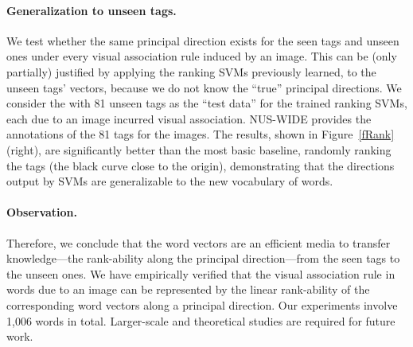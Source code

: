\documentclass[10pt,twocolumn,letterpaper]{article}
\begin{document}
\paragraph{Generalization to unseen tags.} We test whether the same principal direction exists for  the seen tags and unseen ones  under every visual association rule induced by an image. This can be (only partially) justified by applying the ranking SVMs previously learned, to the unseen tags\rq{} vectors, because we do not  know the ``true'' principal directions. We consider the with 81 unseen tags  as the ``test data'' for the trained ranking SVMs, each due to an image incurred visual association. NUS-WIDE provides the annotations of the 81 tags for the images. The results, shown in Figure~\ref{fRank}(right), are significantly better than the most basic baseline, randomly ranking the tags (the black curve close to the origin),  demonstrating that the directions output by SVMs are generalizable to the new vocabulary  of words. \vspace{-15pt}

\paragraph{Observation.} Therefore, we conclude that the word vectors  are an efficient media to transfer knowledge---the  rank-ability along the principal direction---from the seen tags to the unseen ones. We have empirically verified that the visual association rule  in words due to an image  can be represented by the linear rank-ability of the corresponding word vectors along a principal direction. Our experiments involve  1,006 words in total. Larger-scale  and theoretical studies are required for future work.
\end{document}
